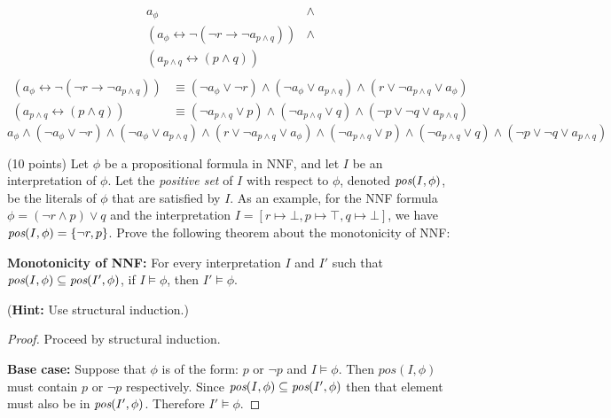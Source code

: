 \documentclass{article}
\newenvironment{solution}{\color{blue} \em }{}
\begin{document}
\begin{enumerate}
\begin{solution}
\[
\begin{array}{ll}
a_{\phi} & \land \\
( a_{\phi} \leftrightarrow \neg (\neg r \rightarrow \neg a_{p \wedge q})) & \land \\
(a_{p\wedge q} \leftrightarrow (p \wedge q)) &  \\
\end{array}
\]
\begin{align*}
    (a_{\phi} \leftrightarrow \neg (\neg r \rightarrow \neg a_{p \wedge q})) &\equiv
(\neg a_\phi \lor \neg r) \land (\neg a_\phi \lor a_{p \land q}) \land (r \lor \neg a_{p \land q} \lor a_\phi) \\
    (a_{p\wedge q} \leftrightarrow (p \wedge q)) &\equiv
    (\neg a_{p\wedge q} \lor p ) \land (\neg a_{p\land q} \lor q) \wedge (\neg p \lor \neg q \lor a_{p\wedge q})
\end{align*}
\[
a_\phi \land
(\neg a_\phi \lor \neg r) \land (\neg a_\phi \lor a_{p \land q}) \land (r \lor \neg a_{p \land q} \lor a_\phi) \land
(\neg a_{p\wedge q} \lor p ) \land (\neg a_{p\land q} \lor q) \wedge (\neg p \lor \neg q \lor a_{p\wedge q})
\]

\end{solution}

\item (10 points)  Let $\phi$ be a propositional formula in NNF, and let $I$ be an interpretation of $\phi$. Let the \emph{positive set} of $I$ with respect to $\phi$, denoted $\emph{pos}(I, \phi)$, be the literals of $\phi$ that are satisfied by $I$. As an example, for the NNF formula $\phi = (\neg r \land p) \lor q$ and the interpretation $I = [r \mapsto \bot, p \mapsto \top, q \mapsto \bot]$, we have $\emph{pos}(I, \phi) = \{ \neg r, p \}$. Prove the following theorem about the monotonicity of NNF:

{\bf Monotonicity of NNF:} For every interpretation $I$ and $I'$ such that $\emph{pos}(I, \phi) \subseteq \emph{pos}(I', \phi)$, if $I \models \phi$, then $I' \models \phi$.

(\textbf{Hint:} Use structural induction.) \label{prob:NNF}

\begin{solution}
\begin{proof}
    Proceed by structural induction.

\item \textbf{Base case:} Suppose that $\phi$ is of the form: $p$ or $\neg p$ and $I \models \phi$. Then $pos(I, \phi)$ must contain $p$ or $\neg p$ respectively. Since $\emph{pos}(I, \phi) \subseteq \emph{pos}(I', \phi)$ then that element must also be in $\emph{pos}(I', \phi)$. Therefore $I' \models \phi$.


\end{proof}
\end{solution}
\end{enumerate}
\end{document}
